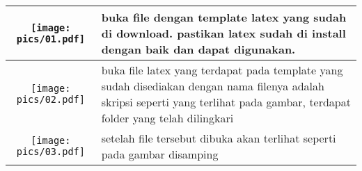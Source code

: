 \documentclass{article}
\begin{document}
	\begin{table}
	\centering
	\begin{tabular}{|c|p{4cm}|} \hline
		 \texttt{[image: pics/01.pdf]} & buka file dengan template latex yang sudah di download.  pastikan latex sudah di install dengan baik dan dapat digunakan.\\ \hline
		 
		  \texttt{[image: pics/02.pdf]}& buka file latex yang terdapat pada template yang sudah disediakan dengan nama filenya adalah skripsi seperti yang terlihat pada gambar, terdapat folder yang telah dilingkari\\ \hline
		
		\texttt{[image: pics/03.pdf]} & setelah file tersebut dibuka  akan terlihat seperti pada  gambar disamping \\ \hline
		
	\end{tabular}
\end{table}
\end{document}
